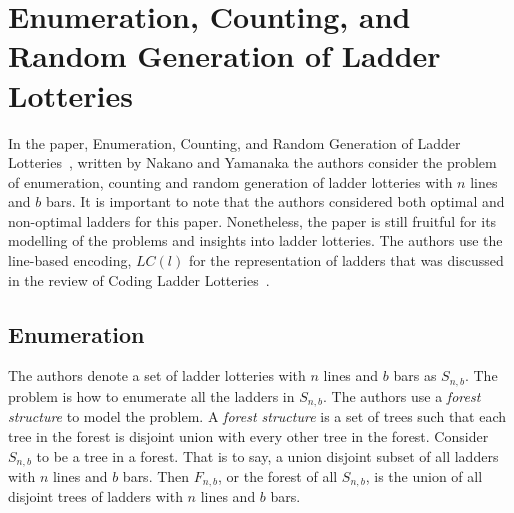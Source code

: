 \section{Enumeration, Counting, and Random Generation of \newline Ladder Lotteries}

In the paper, Enumeration, Counting, and Random Generation of Ladder Lotteries~\cite{A6}, written by Nakano and Yamanaka 
the authors consider the problem of enumeration, counting and 
random generation of ladder lotteries with $n$ lines and $b$ bars. 
It is important to note that the authors considered both optimal and 
non-optimal ladders for this paper. Nonetheless, the paper is still fruitful 
for its modelling of the problems and insights into ladder lotteries.
The authors use  the line-based encoding, $LC(l)$ for the representation of ladders 
that was discussed in the review of Coding Ladder Lotteries~\cite{A5}.

\subsection{Enumeration}
The authors denote a set of ladder lotteries with $n$ lines and 
$b$ bars as $S_{n,b}$. The problem is how to enumerate all the 
ladders in $S_{n,b}$. The authors use a \emph{forest structure}
to model the problem. A \emph{forest structure} is a set of trees 
such that each tree in the forest is disjoint union with every other 
tree in the forest. Consider $S_{n,b}$ to be a tree in a forest.
That is to say, a union disjoint subset of all ladders with $n$
lines and $b$ bars. Then $F_{n,b}$, or the forest of all $S_{n,b}$,
is the union of all disjoint trees of ladders with $n$ lines and $b$ bars. 


    
